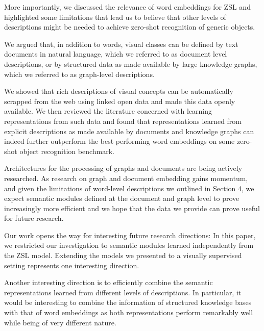 More importantly, we discussed the relevance of word embeddings for ZSL and highlighted some limitations that lead us to believe that other levels of descriptions might be needed to achieve zero-shot recognition of generic objects. 

We argued that, in addition to words, visual classes can be defined by text documents in natural language, which we referred to as document level descriptions, or by structured data as made available by large knowledge graphs, which we referred to as graph-level descriptions. 

We showed that rich descriptions of visual concepts can be automatically scrapped from the web using linked open data and made this data openly available. We then reviewed the literature concerned with learning representations from such data and found that representations learned from explicit descriptions as made available by documents and knowledge graphs can indeed further outperform the best performing word embeddings on some zero-shot object recognition benchmark. 

Architectures for the processing of graphs and documents are being actively researched. As research on graph and document embedding gains momentum, and given the limitations of word-level descriptions we outlined in Section 4, we expect semantic modules defined at the document and graph level to prove increasingly more efficient and we hope that the data we provide can prove useful for future research.

Our work opens the way for interesting future research directions: In this paper, we restricted our investigation to semantic modules learned independently from the ZSL model. Extending the models we presented to a visually supervised setting represents one interesting direction. 

Another interesting direction is to efficiently combine the semantic representations learned from different levels of descriptions. In particular, it would be interesting to combine the information of structured knowledge bases with that of word embeddings as both representations perform remarkably well while being of very different nature.
